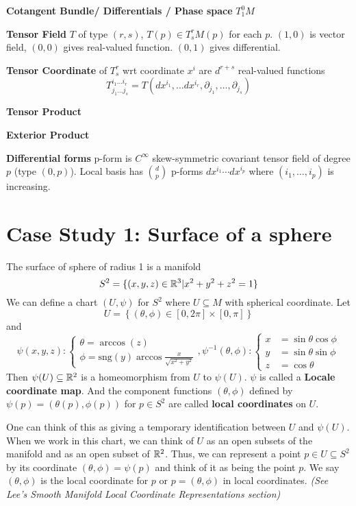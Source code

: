 \documentclass[12pt]{article}
\begin{document}
\textbf{Cotangent Bundle/ Differentials / Phase space} $T^0_1M$

\textbf{Tensor Field} $T$ of type $(r,s)$, $T(p) \in T^r_s M (p)$ for each $p$. $(1,0)$  is vector field, $(0,0)$ gives real-valued function. $(0, 1)$ gives differential.

\textbf{Tensor Coordinate} of $T^r_s$ wrt coordinate $x^i$ are $d^{r+s}$ real-valued functions $$T^{i_1\ldots i_r}_{j_1\ldots j_s} = T(dx^{i_1}, \ldots dx^{i_r}, \partial_{j_1}, \ldots , \partial_{j_s})$$

\textbf{Tensor Product}

\textbf{Exterior Product}

\textbf{Differential forms} p-form is $C^\infty$ skew-symmetric covariant tensor field of degree $p$ (type $(0,p)$). Local basis has ${d \choose p}$ p-forms $dx^{i_1}\cdots dx^{i_p}$ where $(i_1,\ldots,i_p)$ is increasing.

\onecolumn
\section*{Case Study 1: Surface of a sphere}
The surface of sphere of radius 1 is a manifold $$S^2 = \{(x, y, z) \in \mathbb{R}^3 | x^2+y^2+z^2 = 1 \}$$
We can define a chart $(U, \psi)$ for $S^2$ where $U\subseteq M$ with spherical coordinate.  Let $$U = \left\{(\theta, \phi) \in [0, 2\pi]\times [0, \pi] \right\} $$
and $$
\psi(x,y,z): \begin{cases}
	\theta = \arccos(z) \\
	\phi = \text{sng}(y) \arccos \frac{x}{\sqrt{x^2 + y^2}}
\end{cases}, 
\psi^{-1}(\theta, \phi): 
\begin{cases}
	x &= \sin\theta \cos\phi \\
	y &= \sin\theta \sin\phi \\
	z &= \cos \theta
\end{cases} 
$$
Then $\psi(U) \subseteq \mathbb{R}^2$ is a homeomorphism from $U$ to $\psi(U)$. $\psi$ is called a \textbf{Locale coordinate map}. And the component functions $(\theta, \phi)$ defined by $\psi(p) = (\theta(p), \phi(p))$ for $p \in S^2$ are called \textbf{local coordinates} on $U$.

One can think of this as giving a temporary identification between $U$ and $\psi(U)$. When we work in this chart, we can think of $U$ as an open subsets of the manifold and as an open subset of $\mathbb{R}^2$. Thus, we can represent a point $p \in U \subseteq S^2$ by its coordinate $(\theta, \phi) = \psi(p)$ and think of it as being the point $p$. We say $(\theta, \phi)$ is the local coordinate for $p$ or $p = (\theta, \phi)$ in local coordinates. \textit{(See Lee's Smooth Manifold Local Coordinate Representations section)}
\end{document}
